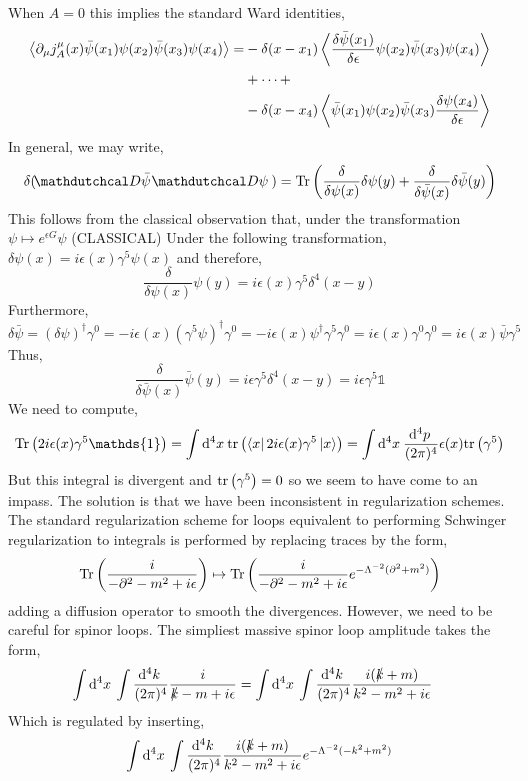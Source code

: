 \documentclass[12pt]{extarticle}
\begin{document}
When $A = 0$ this implies the standard Ward identities,
\begin{align*}
\left< \partial_\mu j^\mu_A(x) \bar{\psi}(x_1) \psi(x_2) \bar{\psi}(x_3) \psi(x_4) \right> = & -\delta(x - x_1) \left<  \frac{\delta \bar{\psi}(x_1)}{\delta \epsilon} \psi(x_2) \bar{\psi}(x_3) \psi(x_4)  \right> 
\\
& + \cdots +
\\
& -\delta(x - x_4) \left<  \bar{\psi}(x_1) \psi(x_2) \bar{\psi}(x_3) \frac{ \delta \psi(x_4)}{\delta \epsilon} \right>
\end{align*}
In general, we may write,
\[ \delta( \pathd{\bar{\psi}} \pathd{\psi} ) = \Tr{ \frac{\delta}{\delta \psi(x)} \delta \psi(y) + \frac{\delta}{\delta \bar{\psi}(x)} \delta \bar{\psi}(y)} \]
This follows from the classical observation that, under the transformation $\psi \mapsto e^{\epsilon G} \psi$ 
(CLASSICAL)
Under the following transformation, $\delta \psi(x) = i \epsilon(x) \gamma^5 \psi(x)$ and therefore, 
\[ \frac{\delta}{\delta \psi(x)} \psi(y) = i \epsilon(x) \gamma^5  \delta^4(x - y) \]
Furthermore, 
\[ \delta \bar{\psi} = (\delta \psi)^\dagger \gamma^0 = - i \epsilon(x) (\gamma^5 \psi)^\dagger \gamma^0 = - i \epsilon(x) \psi^\dagger \gamma^5 \gamma^0 = i \epsilon(x) \gamma^0 \gamma^0 = i \epsilon(x) \bar{\psi} \gamma^5 \]
Thus,
\[ \frac{\delta}{\delta \bar{\psi}(x)} \bar{\psi}(y) = i \epsilon \gamma^5 \delta^4(x - y) = i \epsilon \gamma^5 \mathds{1} \]
We need to compute,
\[ \Tr{2 i \epsilon(x) \gamma^5 \mathds{1}} = \int \dn{4}{x} \tr{\bra{x} 2 i \epsilon(x) \gamma^5 \ket{x}} = \int \dn{4}{x} \frac{\dn{4}{p}}{(2 \pi)^4} \epsilon(x) \tr{\gamma^5} \]
But this integral is divergent and $\mathrm{tr} \left( \gamma^5 \right) = 0$ so we seem to have come to an impass. The solution is that we have been inconsistent in regularization schemes. 
The standard regularization scheme for loops equivalent to performing Schwinger regularization to integrals is performed by replacing traces by the form,
\[ \mathrm{Tr}\left( \frac{i}{-\partial^2 - m^2 + i \epsilon} \right) \mapsto \mathrm{Tr}\left( \frac{i}{-\partial^2 - m^2 + i \epsilon} e^{- \Lambda^{-2} (\partial^2 + m^2)}  \right) \]
adding a diffusion operator to smooth the divergences. However, we need to be careful for spinor loops. The simpliest massive spinor loop amplitude takes the form,
\begin{align*}
\int \mathrm{d}^{4} x \: \int \frac{\mathrm{d}^{4} k \:}{(2 \pi)^4} \frac{i}{\slashed{k} - m + i \epsilon} & = \int \mathrm{d}^{4} x \: \int \frac{\mathrm{d}^{4} k \:}{(2 \pi)^4} \frac{i (\slashed{k} + m)}{k^2 - m^2 + i \epsilon}
\end{align*}
Which is regulated by inserting,
\[ \int \mathrm{d}^{4} x \: \int \frac{\mathrm{d}^{4} k \:}{(2 \pi)^4} \frac{i (\slashed{k} + m)}{k^2 - m^2 + i \epsilon} e^{- \Lambda^{-2} (-k^2 + m^2)} \]
\end{document}

